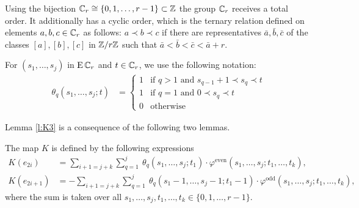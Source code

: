 Using the bijection $\mathbb{C}_r \cong \{0,1,\dots,r-1\} \subset \mathbb{Z}$ the group $\mathbb{C}_r$ receives a total order.
It additionally has a cyclic order, which is the ternary relation defined on elements $a,b,c \in \mathbb{C}_r$ as follows:
$a \prec b \prec c$ if there are representatives $\bar{a},\bar{b},\bar{c}$ of the classes $[a],[b],[c]$ in $\mathbb{Z}/r\mathbb{Z}$ such that $\bar{a} < \bar{b} < \bar{c} < \bar{a}+r$.

{For $(s_1,\dots,s_j)$ in $\operatorname{E}\mathbb{C}_r$ and $t\in \mathbb{C}_r$, we use the following notation:
\begin{align*}
    \theta_q(s_1,\ldots,s_j;t) &= \begin{cases}
        1 & \text{if $q>1$ and $s_{q-1}+1\prec s_q\prec t$}\\
        1 & \text{if $q=1$ and $0\prec s_q\prec t$} \\
        0 & \text{otherwise}
    \end{cases}
\end{align*}


Lemma \ref{l:K3} is a consequence of the following two lemmas.

\begin{lemma}
	The map $K$ is defined by the following expressions
	\begin{align} \label{eq:homotopyK'1}
		K(e_{2i}) &= \sum_{i+1 = j+k} \sum_{q=1}^j \
		\theta_q(s_1,\dots,s_j;t_1)\cdot \varphi^{\mathrm{even}}(s_1,\dots,s_j;t_1,\dots,t_k), \\ \label{eq:homotopyK'2}
		K(e_{2i+1}) &= -\sum_{i+1 = j+k} \sum_{q=1}^j \
		\theta_q(s_1-1,\dots,s_j-1;t_1-1)\cdot \varphi^{\mathrm{odd}}(s_1,\dots,s_j;t_1,\dots,t_k),
	\end{align}
	where the sum is taken over all $s_1,\dots,s_j,t_1,\dots,t_k\in \{0,1,\dots,r-1\}$.
\end{lemma}

}

